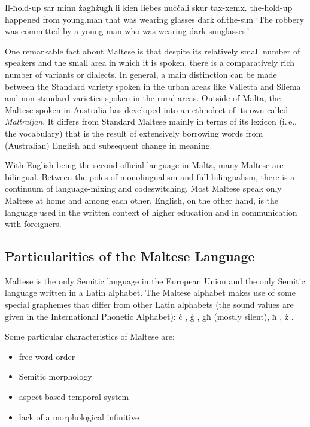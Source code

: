 \documentclass[]{../../metanetpaper}
\begin{document}
\begin{multicols}{2}
\begin{examples}
\item
\gll Il-ħold-up sar minn żagħżugħ li kien liebes nuċċali skur tax-xemx.
the-hold-up happened from young.man that was wearing glasses dark of.the-sun
\glt `The robbery was committed by a young man who was wearing dark sunglasses.'
\glend
\end{examples}

One remarkable fact about Maltese is that despite its relatively small number of speakers and the small area in which it is spoken, there is a comparatively rich number of variants or dialects. In general, a main distinction can be made between the Standard variety spoken in the urban areas like Valletta and Sliema and non-standard varieties spoken in the rural areas. Outside of Malta, the Maltese spoken in Australia has developed into an ethnolect of its own called \emph{Maltraljan}. It differs from Standard Maltese mainly in terms of its lexicon (i.\,e., the vocabulary) that is the result of extensively borrowing words from (Australian) English and subsequent change in meaning. 

With English being the second official language in Malta, many Maltese are bilingual. Between the poles of monolingualism and full bilingualism, there is a continuum of language-mixing and codeswitching. Most Maltese speak only Maltese at home and among each other. English, on the other hand, is the language used in the written context of higher education and in communication with foreigners. 

\subsection{Particularities of the Maltese Language}

Maltese is the only Semitic language in the European Union and the only Semitic language written in a Latin alphabet. The Maltese alphabet makes use of some special graphemes that differ from other Latin alphabets (the sound values are given in the International Phonetic Alphabet): ċ , ġ , għ (mostly silent), ħ , ż .

Some particular characteristics of Maltese are:

\begin{itemize}
\item free word order 
\item Semitic morphology 
\item aspect-based temporal system
\item lack of a morphological infinitive
\end{itemize}


\end{multicols}
\end{document}

